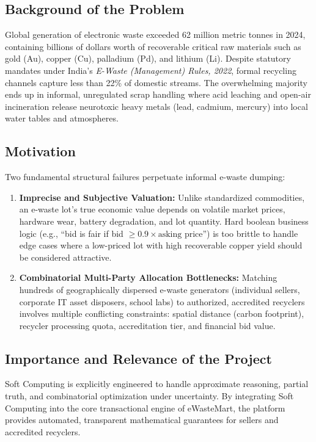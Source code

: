 \documentclass[12pt,a4paper]{article}
\begin{document}
\subsection{Background of the Problem}
Global generation of electronic waste exceeded 62 million metric tonnes in 2024, containing billions of dollars worth of recoverable critical raw materials such as gold (Au), copper (Cu), palladium (Pd), and lithium (Li). Despite statutory mandates under India's \textit{E-Waste (Management) Rules, 2022}, formal recycling channels capture less than 22\% of domestic streams. The overwhelming majority ends up in informal, unregulated scrap handling where acid leaching and open-air incineration release neurotoxic heavy metals (lead, cadmium, mercury) into local water tables and atmospheres.

\subsection{Motivation}
Two fundamental structural failures perpetuate informal e-waste dumping:
\begin{enumerate}
    \item \textbf{Imprecise and Subjective Valuation:} Unlike standardized commodities, an e-waste lot's true economic value depends on volatile market prices, hardware wear, battery degradation, and lot quantity. Hard boolean business logic (e.g., ``bid is fair if bid $\ge 0.9 \times \text{asking price}$'') is too brittle to handle edge cases where a low-priced lot with high recoverable copper yield should be considered attractive.
    \item \textbf{Combinatorial Multi-Party Allocation Bottlenecks:} Matching hundreds of geographically dispersed e-waste generators (individual sellers, corporate IT asset disposers, school labs) to authorized, accredited recyclers involves multiple conflicting constraints: spatial distance (carbon footprint), recycler processing quota, accreditation tier, and financial bid value.
\end{enumerate}

\subsection{Importance and Relevance of the Project}
Soft Computing is explicitly engineered to handle approximate reasoning, partial truth, and combinatorial optimization under uncertainty. By integrating Soft Computing into the core transactional engine of eWasteMart, the platform provides automated, transparent mathematical guarantees for sellers and accredited recyclers.
\end{document}
